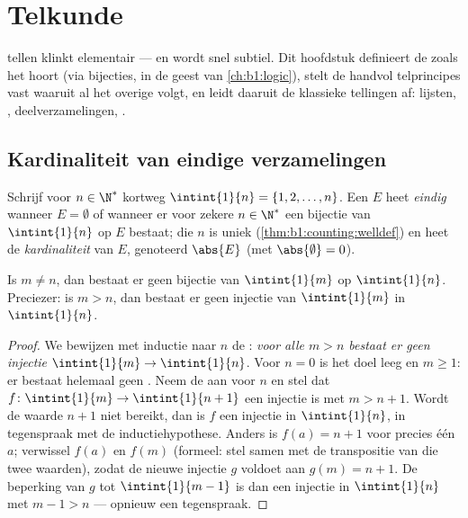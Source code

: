 \chapter{Telkunde}\label{ch:b1:counting}

 tellen klinkt elementair --- en wordt snel subtiel.
Dit hoofdstuk definieert de  zoals het hoort (via bijecties,
in de geest van \cref{ch:b1:logic}), stelt de handvol telprincipes vast
waaruit al het overige volgt, en leidt daaruit de klassieke tellingen af:
lijsten, , deelverzamelingen, .

\section{Kardinaliteit van eindige verzamelingen}

\begin{definition}\label{def:b1:counting:card}
Schrijf voor $n \in \N^*$ kortweg $\intint{1}{n} = \{1, 2, \dots, n\}$.
Een  $E$ heet \emph{eindig} wanneer
$E = \emptyset$ of wanneer er voor zekere $n \in \N^*$ een bijectie van
$\intint{1}{n}$ op $E$ bestaat; die $n$ is uniek
(\cref{thm:b1:counting:welldef}) en heet de
\emph{kardinaliteit} van $E$, genoteerd $\abs{E}$
(met $\abs{\emptyset} = 0$).
\end{definition}

\begin{theorem}\label{thm:b1:counting:welldef}
Is $m \neq n$, dan bestaat er geen bijectie van $\intint{1}{m}$ op
$\intint{1}{n}$. Preciezer: is $m > n$, dan bestaat er geen injectie van
$\intint{1}{m}$ in $\intint{1}{n}$.
\end{theorem}

\begin{proof}
We bewijzen met inductie naar $n$ de : \emph{voor alle $m > n$
bestaat er geen injectie $\intint{1}{m} \to \intint{1}{n}$}. Voor $n = 0$
is het doel leeg en $m \geq 1$: er bestaat helemaal geen . Neem
de  aan voor $n$ en stel dat $f \colon \intint{1}{m} \to
\intint{1}{n+1}$ een injectie is met $m > n + 1$. Wordt de waarde $n + 1$
niet bereikt, dan is $f$ een injectie in $\intint{1}{n}$, in tegenspraak
met de inductiehypothese. Anders is $f(a) = n + 1$ voor precies één $a$;
verwissel $f(a)$ en $f(m)$ (formeel: stel samen met de transpositie van
die twee waarden), zodat de nieuwe injectie $g$ voldoet aan $g(m) = n +
1$. De beperking van $g$ tot $\intint{1}{m-1}$ is dan een injectie in
$\intint{1}{n}$ met $m - 1 > n$ --- opnieuw een tegenspraak.
\end{proof}

